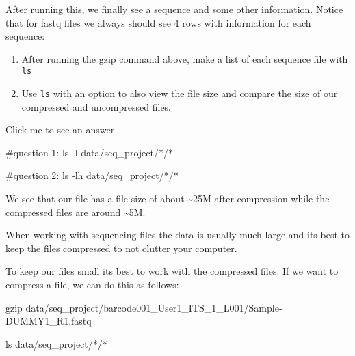 \documentclass[
  letterpaper,
  DIV=11,
  numbers=noendperiod]{scrreprt}
\newenvironment{Shaded}{}{}
\newcommand{\AttributeTok}[1]{\textcolor[rgb]{0.84,0.23,0.29}{#1}}
\newcommand{\CommentTok}[1]{\textcolor[rgb]{0.42,0.45,0.49}{#1}}
\newcommand{\FunctionTok}[1]{\textcolor[rgb]{0.44,0.26,0.76}{#1}}
\newcommand{\NormalTok}[1]{\textcolor[rgb]{0.14,0.16,0.18}{#1}}
\newcommand{\PreprocessorTok}[1]{\textcolor[rgb]{0.84,0.23,0.29}{#1}}
\providecommand{\tightlist}{%
  \setlength{\itemsep}{0pt}\setlength{\parskip}{0pt}}\usepackage{longtable,booktabs,array}
\begin{document}
After running this, we finally see a sequence and some other
information. Notice that for fastq files we always should see 4 rows
with information for each sequence:

\begin{tcolorbox}[enhanced jigsaw, rightrule=.15mm, colbacktitle=quarto-callout-caution-color!10!white, colframe=quarto-callout-caution-color-frame, colback=white, arc=.35mm, opacitybacktitle=0.6, coltitle=black, bottomtitle=1mm, breakable, bottomrule=.15mm, leftrule=.75mm, titlerule=0mm, title=\textcolor{quarto-callout-caution-color}{\faFire}\hspace{0.5em}{Exercise}, toprule=.15mm, toptitle=1mm, opacityback=0, left=2mm]

\begin{enumerate}
\def\labelenumi{\arabic{enumi}.}
\tightlist
\item
  After running the gzip command above, make a list of each sequence
  file with \texttt{ls}
\item
  Use \texttt{ls} with an option to also view the file size and compare
  the size of our compressed and uncompressed files.
\end{enumerate}

Click me to see an answer

\begin{Shaded}
\begin{Highlighting}[]
\CommentTok{\#question 1:}
\FunctionTok{ls} \AttributeTok{{-}l}\NormalTok{ data/seq\_project/}\PreprocessorTok{*}\NormalTok{/}\PreprocessorTok{*}

\CommentTok{\#question 2:}
\FunctionTok{ls} \AttributeTok{{-}lh}\NormalTok{ data/seq\_project/}\PreprocessorTok{*}\NormalTok{/}\PreprocessorTok{*}
\end{Highlighting}
\end{Shaded}

We see that our file has a file size of about \textasciitilde25M after
compression while the compressed files are around \textasciitilde5M.

When working with sequencing files the data is usually much large and
its best to keep the files compressed to not clutter your computer.

\end{tcolorbox}

To keep our files small its best to work with the compressed files. If
we want to compress a file, we can do this as follows:

\begin{Shaded}
\begin{Highlighting}[]
\FunctionTok{gzip}\NormalTok{ data/seq\_project/barcode001\_User1\_ITS\_1\_L001/Sample{-}DUMMY1\_R1.fastq}

\FunctionTok{ls}\NormalTok{ data/seq\_project/}\PreprocessorTok{*}\NormalTok{/}\PreprocessorTok{*}
\end{Highlighting}
\end{Shaded}
\end{document}

